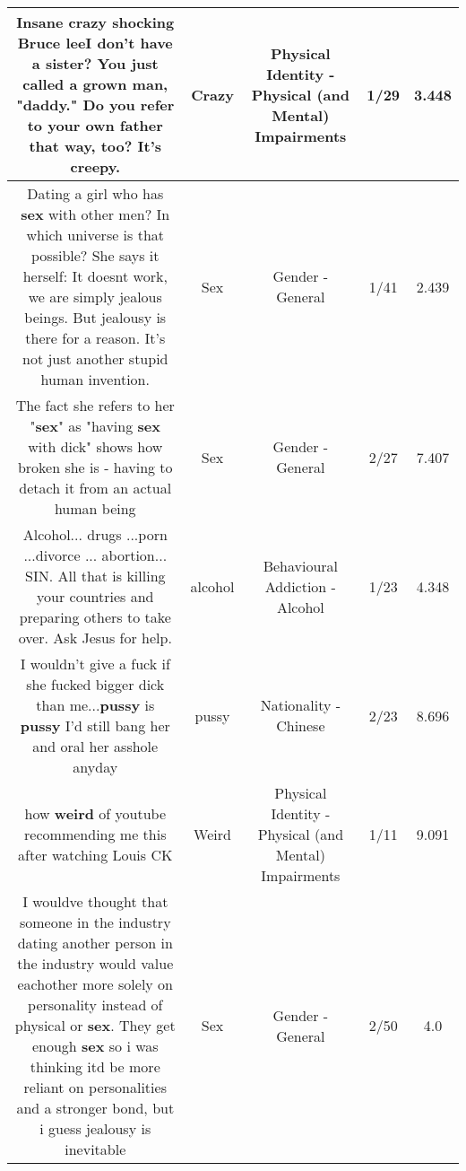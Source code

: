 \documentclass[11pt]{article}
\newlength\mylength
\begin{document}
\begin{center}
\begin{longtable}{|C{.65\mylength}|C{.30\mylength}|C{.12\mylength}|C{.12\mylength}|C{.12\mylength}|}
  \small Insane \textbf{crazy} shocking Bruce leeI don't have a sister? You just called a grown man, "daddy." Do you refer to your own father that way, too? It's creepy.\normalsize   & Crazy & Physical Identity - Physical (and Mental) Impairments & 1/29 & 3.448 \\  \hline
  \small Dating a girl who has \textbf{sex} with other men? In which universe is that possible? She says it herself: It doesnt work, we are simply jealous beings. But jealousy is there for a reason. It's not just another stupid human invention.\normalsize   & Sex & Gender - General & 1/41 & 2.439 \\  \hline
  \small The fact she refers to her "\textbf{sex}" as "having \textbf{sex} with dick" shows how broken she is - having to detach it from an actual human being\normalsize   & Sex & Gender - General & 2/27 & 7.407 \\  \hline
  \small Alcohol... drugs ...porn ...divorce ... abortion... SIN. All that is killing your countries and preparing others to take over. Ask Jesus for help.\normalsize   & alcohol & Behavioural Addiction - Alcohol & 1/23 & 4.348 \\  \hline
  \small I wouldn't give a fuck if she fucked bigger dick than me...\textbf{pussy} is \textbf{pussy} I'd still bang her and oral her asshole anyday\normalsize   & pussy & Nationality - Chinese & 2/23 & 8.696 \\  \hline
  \small how \textbf{weird} of youtube recommending me this after watching Louis CK\normalsize   & Weird & Physical Identity - Physical (and Mental) Impairments & 1/11 & 9.091 \\  \hline
  \small I wouldve thought that someone in the industry dating another person in the industry would value eachother more solely on personality instead of physical or \textbf{sex}. They get enough \textbf{sex} so i was thinking itd be more reliant on personalities and a stronger bond, but i guess jealousy is inevitable\normalsize   & Sex & Gender - General & 2/50 & 4.0 \\  \hline

\end{longtable}
\end{center}
\end{document}
